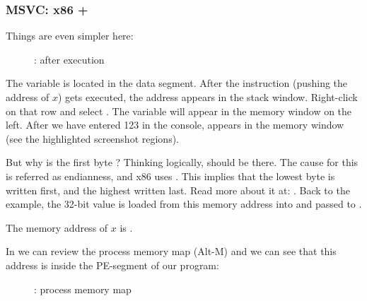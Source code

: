 \clearpage
\subsubsection{MSVC: x86 + \olly}
\myindex{\olly}

Things are even simpler here:

\begin{figure}[H]
\centering
{}
\caption{\olly: after \scanf execution}
\label{fig:scanf_ex2_olly_1}
\end{figure}

The variable is located in the data segment.
After the \PUSH instruction (pushing the address of $x$) gets executed, 
the address appears in the stack window. Right-click on that row and select .
The variable will appear in the memory window on the left.
After we have entered 123 in the console, 
 appears in the memory window (see the highlighted screenshot regions).

But why is the first byte ?
Thinking logically,  should be
there.
The cause for this is referred as  \gls{endianness}, and x86 uses .
This implies that the lowest byte is written first, and the highest written last.
Read more about it at: .
Back to the example, the 32-bit value is loaded from this memory address into \EAX and passed to \printf.

The memory address of $x$ is .

\clearpage
In \olly we can review the process memory map (Alt-M)
and we can see that this address is inside the  PE-segment of our program:

\begin{figure}[H]
\centering
{}
\caption{\olly: process memory map}
\label{fig:scanf_ex2_olly_2}
\end{figure}

